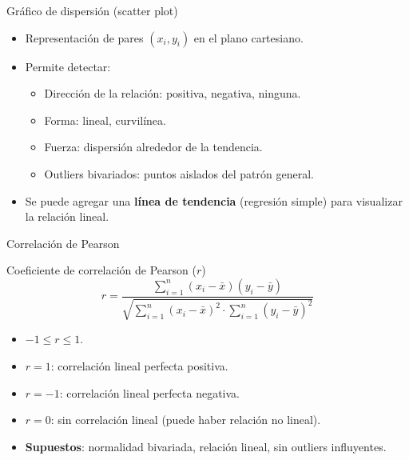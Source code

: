 \documentclass[aspectratio=169]{beamer}
\begin{document}
\begin{frame}{Gráfico de dispersión (scatter plot)}
  \begin{itemize}
    \item Representación de pares $(x_i, y_i)$ en el plano cartesiano.
    \item Permite detectar:
      \begin{itemize}
        \item Dirección de la relación: positiva, negativa, ninguna.
        \item Forma: lineal, curvilínea.
        \item Fuerza: dispersión alrededor de la tendencia.
        \item Outliers bivariados: puntos aislados del patrón general.
      \end{itemize}
    \item Se puede agregar una \textbf{línea de tendencia} (regresión simple) para visualizar la relación lineal.
  \end{itemize}
\end{frame}

\begin{frame}{Correlación de Pearson}
  \begin{block}{Coeficiente de correlación de Pearson ($r$)}
    \[
      r = \frac{\sum_{i=1}^n (x_i - \bar{x})(y_i - \bar{y})}
               {\sqrt{\sum_{i=1}^n (x_i - \bar{x})^2 \cdot \sum_{i=1}^n (y_i - \bar{y})^2}}
    \]
  \end{block}
  \begin{itemize}
    \item $-1 \le r \le 1$.
    \item $r = 1$: correlación lineal perfecta positiva.
    \item $r = -1$: correlación lineal perfecta negativa.
    \item $r = 0$: sin correlación lineal (puede haber relación no lineal).
    \item \textbf{Supuestos}: normalidad bivariada, relación lineal, sin outliers influyentes.
  \end{itemize}
\end{frame}
\end{document}

